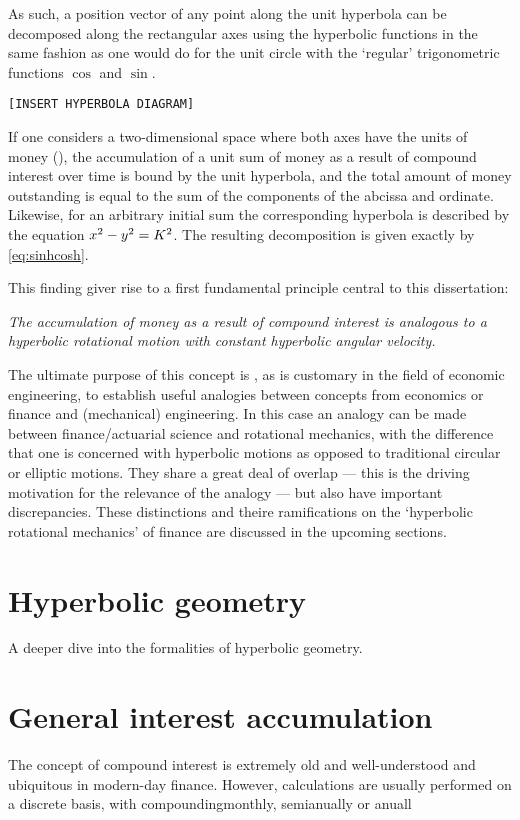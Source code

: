 As such, a position vector of any point along the unit hyperbola can be decomposed along the rectangular axes using the hyperbolic functions in the same fashion as one would do for the unit circle with the `regular' trigonometric functions $\cos$ and $\sin$.

\begin{center}
    \texttt{[INSERT HYPERBOLA DIAGRAM]}
\end{center}

If one considers a two-dimensional space where both axes have the units of money (\si{\money}), the accumulation of a unit sum of money as a result of compound interest over time is bound by the unit hyperbola, and the total amount of money outstanding is equal to the sum of the components of the abcissa and ordinate. Likewise, for an arbitrary initial sum \ininv the corresponding hyperbola is described by the equation $x^2 - y^2 = K^2$. The resulting decomposition is given exactly by \cref{eq:sinhcosh}.

This finding giver rise to a first fundamental principle central to this dissertation:

\textit{
The accumulation of money as a result of compound interest is analogous to a hyperbolic rotational motion with constant hyperbolic angular velocity.}

The ultimate purpose of this concept is , as is customary in the field of economic engineering, to establish useful analogies between concepts from economics or finance and (mechanical) engineering. In this case an analogy can be made between finance/actuarial science and rotational mechanics, with the difference that one is concerned with hyperbolic motions as opposed to traditional circular or elliptic motions. They share a great deal of overlap --- this is the driving motivation for the relevance of the analogy --- but also have important discrepancies. These distinctions and theire ramifications on the `hyperbolic rotational mechanics' of finance are discussed in the upcoming sections.

\section{Hyperbolic geometry}
A deeper dive into the formalities of hyperbolic geometry.

\section{General interest accumulation}
The concept of compound interest is extremely old and well-understood and ubiquitous in modern-day finance. However, calculations are usually performed on a discrete basis, with compoundingmonthly, semianually or anuall

